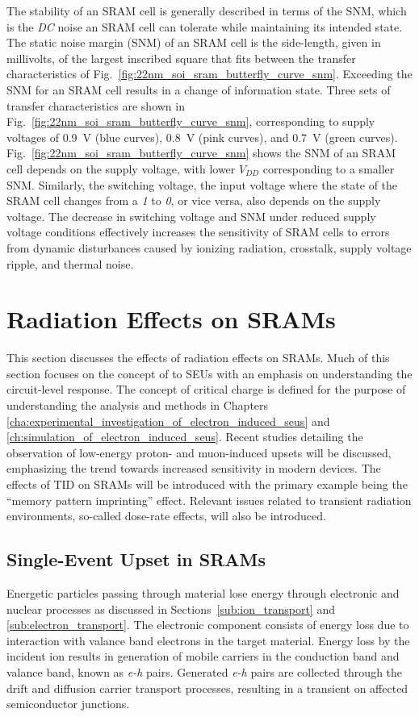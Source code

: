 The stability of an SRAM cell is generally described in terms of the SNM, which is the \emph{DC} noise an SRAM cell can tolerate while maintaining its intended state.
The static noise margin (SNM) of an SRAM cell is the side-length, given in millivolts, of the largest inscribed square that fits between the transfer characteristics of Fig.~\ref{fig:22nm_soi_sram_butterfly_curve_snm}.
Exceeding the SNM for an SRAM cell results in a change of information state.
Three sets of transfer characteristics are shown in Fig.~\ref{fig:22nm_soi_sram_butterfly_curve_snm}, corresponding to supply voltages of 0.9~V (blue curves), 0.8~V (pink curves), and 0.7~V (green curves).
Fig.~\ref{fig:22nm_soi_sram_butterfly_curve_snm} shows the SNM of an SRAM cell depends on the supply voltage, with lower $V_{DD}$ corresponding to a smaller SNM.
Similarly, the switching voltage, the input voltage where the state of the SRAM cell changes from a \emph{1} to \emph{0}, or vice versa, also depends on the supply voltage.
The decrease in switching voltage and SNM under reduced supply voltage conditions effectively increases the sensitivity of SRAM cells to errors from dynamic disturbances caused by ionizing radiation, crosstalk, supply voltage ripple, and thermal noise.

\section{Radiation Effects on SRAMs} %
\label{sec:radiation_effects_on_sram}
This section discusses the effects of radiation effects on SRAMs. 
Much of this section focuses on the concept of to SEUs with an emphasis on understanding the circuit-level response.
The concept of critical charge is defined for the purpose of understanding the analysis and methods in Chapters \ref{cha:experimental_investigation_of_electron_induced_seus} and \ref{ch:simulation_of_electron_induced_seus}.
Recent studies detailing the observation of low-energy proton- and muon-induced upsets will be discussed, emphasizing the trend towards increased sensitivity in modern devices.  
The effects of TID on SRAMs will be introduced with the primary example being the ``memory pattern imprinting'' effect. 
Relevant issues related to transient radiation environments, so-called dose-rate effects, will also be introduced.

\subsection{Single-Event Upset in SRAMs} %
\label{sub:single_event_upset_in_srams}
Energetic particles passing through material lose energy through electronic and nuclear processes as discussed in Sections~\ref{sub:ion_transport} and \ref{sub:electron_transport}. 
The electronic component consists of energy loss due to interaction with valance band electrons in the target material. 
Energy loss by the incident ion results in generation of mobile carriers in the conduction band and valance band, known as \emph{e-h} pairs.
Generated \emph{e-h} pairs are collected through the drift and diffusion carrier transport processes, resulting in a transient on affected semiconductor junctions.

